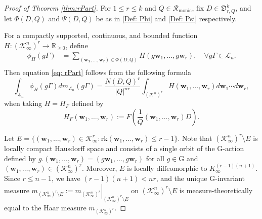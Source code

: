 \documentclass[11pt,a4paper,reqno]{amsart}
\newcommand{\rk}{\mathrm{rk}}
\newcommand{\Rmo}{\mathcal R_{\text{monic}}}
\theoremstyle{definition}
\theoremstyle{remark}
\numberwithin{equation}{section}
\begin{document}
\begin{proof}[Proof of Theorem \ref{thm:rPart}]
 For $1\le r \le k$ and $Q\in \Rmo$, fix $D\in \mathfrak D^k_{r,Q}$, and let $\Phi(D,Q)$ and $\Psi(D,Q)$ be as in \eqref{Def: Phi} and \eqref{Def: Psi} respectively.

For a compactly supported, continuous, and bounded function $H:\left(\mathcal{K}_{\infty}^n\right)^r\rightarrow \mathbb{R}_{\geq 0}$, define
\[\begin{split}
\phi_H(g\Gamma)&=\sum_{(\mathbf{w_1},\dots,\mathbf{w}_r)\in \Phi(D,Q)}H\left(g\mathbf{w}_1,\dots,g\mathbf{w}_r\right),\quad \forall g\Gamma\in \mathcal L_n.\\
\end{split}\]
Then equation \eqref{eq: rPart} follows from the following formula
\begin{equation}\label{eq: H-integral}
\int_{\mathcal L_n} \phi_H(g\Gamma) dm_{\mathcal L_n}(g\Gamma)
=\frac {N(D,Q)^r} {|Q|^{nr}} \int_{(\mathcal K^n)^r} H(\mathbf w_1, \ldots, \mathbf w_r) d\mathbf w_1 \cdots d\mathbf w_r,
\end{equation}
when taking $H=H_F$ defined by
    \[
    H_F(\mathbf w_1, \ldots, \mathbf w_r)
    :=F\left(\frac 1 Q (\mathbf w_1, \ldots, \mathbf w_r)D\right).
    \]
    
Let $E=\{(\mathbf w_1, \ldots, \mathbf w_r)\in \mathcal K_\infty^r: \rk(\mathbf w_1, \ldots, \mathbf w_r)\le r-1\}$. Note that $(\mathcal K^n_\infty)^r\setminus E$ is locally compact Hausdorff space and consists of a single orbit of the $\mathrm{G}$-action defined by $g.(\mathbf w_1, \ldots, \mathbf w_r)=(g\mathbf w_1, \ldots, g\mathbf w_r)$ for all $g\in \mathrm{G}$ and $(\mathbf w_1, \ldots, \mathbf w_r)\in (\mathcal K^n_\infty)^r$.
Moreover, $E$ is locally diffeomorphic to $K^{(r-1)(n+1)}_\infty$. Since $r\le n-1$, we have $(r-1)(n+1)<nr$, and the unique $\mathrm{G}$-invariant measure $m_{(\mathcal K_\infty^n)^r\setminus E}:=\left.m_{(\mathcal K_\infty^n)^r}\right\vert_{(\mathcal K_\infty^n)^r\setminus E}$ on $(\mathcal K_\infty^n)^r\setminus E$ is measure-theoretically equal to the Haar measure $m_{(\mathcal K_\infty^n)^r}$.


\end{proof}
\end{document}
